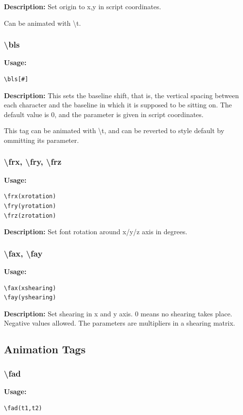 \documentclass{spec}
\begin{document}
\textbf{Description:}
Set origin to x,y in script coordinates.

Can be animated with \textbackslash t.

\subsubsection{\textbackslash bls}
\textbf{Usage:}
\begin{verbatim}
\bls[#]
\end{verbatim}

\textbf{Description:}
This sets the baseline shift, that is, the vertical spacing between each character and the baseline
in which it is supposed to be sitting on. The default value is 0, and the parameter is given in
script coordinates.

This tag can be animated with \textbackslash t, and can be reverted to style default by ommitting
its parameter.

\subsubsection{\textbackslash frx, \textbackslash fry, \textbackslash frz}
\textbf{Usage:}
\begin{verbatim}
\frx(xrotation)
\fry(yrotation)
\frz(zrotation)
\end{verbatim}

\textbf{Description:}
Set font rotation around x/y/z axis in degrees.


\subsubsection{\textbackslash fax, \textbackslash fay}
\textbf{Usage:}
\begin{verbatim}
\fax(xshearing)
\fay(yshearing)
\end{verbatim}

\textbf{Description:}
Set shearing in x and y axis. 0 means no shearing takes place. Negative values allowed.
The parameters are multipliers in a shearing matrix.

\subsection{Animation Tags}

\subsubsection{\textbackslash fad}
\textbf{Usage:}
\begin{verbatim}
\fad(t1,t2)
\end{verbatim}
\end{document}

